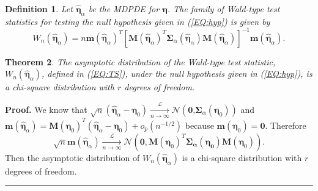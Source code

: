 \documentclass[a4paper]{article}%
\newtheorem{theorem}{Theorem}
\newtheorem{definition}[theorem]{Definition}
\newenvironment{proof}[1][Proof]{\noindent \textbf{#1.} }{\  \rule{0.5em}{0.5em}}
\begin{document}
\begin{definition}
Let $\widehat{\boldsymbol{\eta}}_{\alpha}$ be the MDPDE for $\boldsymbol{\eta
}$. The family of Wald-type test statistics for testing the null hypothesis
given in (\ref{EQ:hyp}) is given by
\begin{equation}
W_{n}(\widehat{\boldsymbol{\eta}}_{\alpha})=n\boldsymbol{m}\left(
\widehat{\boldsymbol{\eta}}_{\alpha}\right)  ^{T}\left[  \boldsymbol{M}%
(\widehat{\boldsymbol{\eta}}_{\alpha})^{T}\boldsymbol{\Sigma}_{\alpha
}(\widehat{\boldsymbol{\eta}}_{\alpha})\boldsymbol{M}%
(\widehat{\boldsymbol{\eta}}_{\alpha})\right]  ^{-1}\boldsymbol{m}\left(
\widehat{\boldsymbol{\eta}}_{\alpha}\right)  . \label{EQ:TS}%
\end{equation}

\end{definition}

\begin{theorem}
The asymptotic distribution of the Wald-type test statistic, $W_{n}%
(\widehat{\boldsymbol{\eta}}_{\alpha})$, defined in (\ref{EQ:TS}), under the
null hypothesis given in (\ref{EQ:hyp}), is a chi-square distribution with $r$
degrees of freedom. \label{THM:asymp_null}
\end{theorem}

\begin{proof}
We know that $\sqrt{n}(\widehat{\boldsymbol{\eta}}_{\alpha}-\boldsymbol{\eta
}_{0})\underset{n\rightarrow\infty}{\overset{\mathcal{L}}{\longrightarrow}%
}\mathcal{N}\left(  \boldsymbol{0}\text{,}\boldsymbol{\Sigma}_{\alpha}\left(
\boldsymbol{\eta}_{0}\right)  \right)  $ and $\boldsymbol{m}\left(
\widehat{\boldsymbol{\eta}}_{\alpha}\right)  =\boldsymbol{M}(\boldsymbol{\eta
}_{0})^{T}(\widehat{\boldsymbol{\eta}}_{\alpha}-\boldsymbol{\eta}_{0}%
)+o_{p}(n^{-1/2})$ because $\boldsymbol{m}\left(  \boldsymbol{\eta}%
_{0}\right)  =\boldsymbol{0}$. Therefore
\[
\sqrt{n} \boldsymbol{m}\left(  \widehat{\boldsymbol{\eta}}_{\alpha}\right)
\underset{n\rightarrow\infty}{\overset{\mathcal{L}}{\longrightarrow}%
}\mathcal{N}\left(  \boldsymbol{0},\boldsymbol{M}(\boldsymbol{\eta}_{0}%
)^{T}\boldsymbol{\boldsymbol{\Sigma}_{\alpha}}(\boldsymbol{\boldsymbol{\eta
}_{0}})\boldsymbol{M}(\boldsymbol{\eta}_{0})\right)  .
\]
Then the asymptotic distribution of $W_{n}(\widehat{\boldsymbol{\eta}}%
_{\alpha})$ is a chi-square distribution with $r$ degrees of freedom.
\end{proof}
\end{document}
